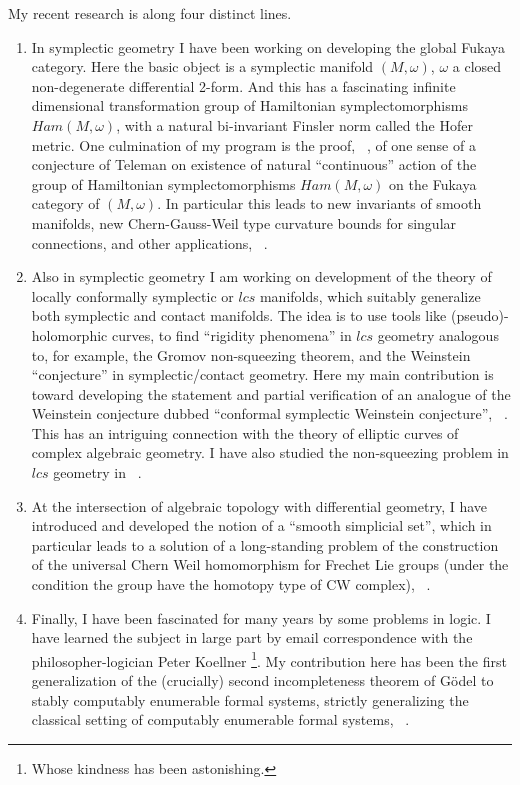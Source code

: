 \documentclass{amsart}
\numberwithin {equation} {section}
\begin{document}
My recent research is along four distinct lines. 
\begin{enumerate}
   \item In symplectic geometry I have been working on developing the global Fukaya category. Here the basic object is a symplectic 
manifold $(M, \omega) $, $\omega$ a closed 
non-degenerate differential 2-form. And this has 
a fascinating infinite dimensional transformation 
group of Hamiltonian symplectomorphisms $Ham (M,  
\omega) $, with a natural bi-invariant Finsler norm called 
the Hofer metric. One culmination of my program is 
the proof, ~\cite{citeSavelyevGlobalFukayacategoryI},  of one 
sense of a conjecture of Teleman on existence of 
natural ``continuous'' action of the group of Hamiltonian 
symplectomorphisms $Ham (M, \omega)$ on the Fukaya 
category of $(M, \omega ) $. In particular this 
leads to new invariants of smooth manifolds, new 
Chern-Gauss-Weil type curvature bounds for 
singular connections, and other applications, 
~\cite{citeSavelyevGlobalFukayacategoryII}.
\item Also in symplectic geometry I am working on 
development of the theory of locally conformally 
symplectic or $lcs$ manifolds, which suitably 
generalize both symplectic and contact manifolds. 
The idea is to use tools like (pseudo)-holomorphic curves, 
to find ``rigidity phenomena'' in $lcs$ geometry analogous to, for example, the Gromov non-squeezing theorem, and the Weinstein 
``conjecture'' in symplectic/contact geometry. 
Here my main contribution is toward developing the statement and 
partial verification of an analogue of the 
Weinstein conjecture dubbed ``conformal symplectic 
Weinstein conjecture'', ~\cite{citeSavelyevConformalSymplectic}.   This has an intriguing 
connection with the theory of elliptic curves of 
complex algebraic geometry. I have also studied 
the non-squeezing problem in $lcs$ geometry in 
~\cite{citeSavelyevLCSnonsqueezing}. 
\item At the intersection of algebraic topology 
with differential geometry, I have introduced and developed the 
notion of a ``smooth simplicial set'', which in 
particular leads to a solution of a long-standing 
problem of the construction of the universal Chern 
Weil homomorphism for Frechet Lie groups (under 
the condition the group have the homotopy type of 
CW complex), ~\cite{citeSavelyevSmoothSimplicial}. 
\item Finally, I have been fascinated for many 
years by some problems in logic. I have learned the subject 
in large part by email correspondence with the 
philosopher-logician Peter Koellner \footnote{Whose kindness has been astonishing.}.  My contribution here has been the 
first generalization of the (crucially) second 
incompleteness theorem of G\"odel to stably 
computably enumerable formal systems, strictly 
generalizing the classical setting of computably 
enumerable formal systems, ~\cite{citeSavelyevIncompleteness}. 
\end{enumerate}
\end{document}
